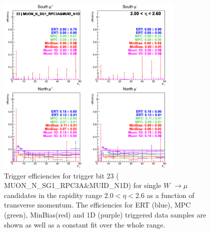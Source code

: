 \begin{figure}[h!]

  \centering

  \includegraphics[width=0.8\textwidth]{./figures/run13_trigeffipt_eta2_trig23_lin.png}
  \caption{\label{fig:run13_trigeffipt_eta2_nper0_trig23_lin} Trigger efficiencies for trigger bit 23 ( MUON\_N\_SG1\_RPC3A\&MUID\_N1D) for single $W$ $\rightarrow \mu$ candidates in the rapidity range $ 2.0 < \eta < 2.6$ as a function of transverse momentum. The efficiencies for ERT (blue), MPC (green), MinBias(red) and 1D (purple) triggered data samples are shown as well as a constant fit over the whole range.}

\end{figure}
\clearpage

